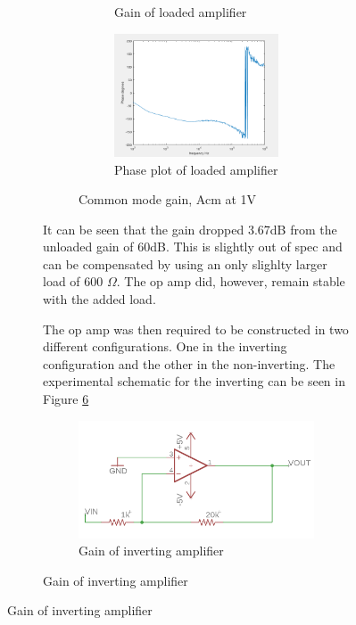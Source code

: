\begin{figure}[H]
\begin{subfigure}[b]{0.45\textwidth}
\begin{figure}[H]
\begin{subfigure}[b]{0.45\textwidth}
		\caption{Gain of loaded amplifier}
		\label{fig:tload}
		\end{subfigure}
		\hfill
		\begin{subfigure}[b]{0.45\textwidth}
			\centering
			\includegraphics[scale=.40]{ExperimentalImplementation/phasewithload.png}
		\caption{Phase plot of loaded amplifier}
		\label{fig:phasewithload}
		\end{subfigure}
		\caption{Common mode gain, Acm at 1V}
		\label{fig:gainwithload}
	\end{figure} 
	
It can be seen that the gain dropped 3.67dB from the unloaded gain of 60dB. This is slightly out of spec and can be compensated by using an only slighlty larger load of 600 $\Omega$. The op amp did, however, remain stable with the added load.
	
	
	
The op amp was then required to be constructed in two different configurations. One in the inverting configuration and the other in the non-inverting. The experimental schematic for the inverting can be seen in Figure \ref{fig:invertingschem}

		\begin{figure}[H]
	\begin{center}
		\includegraphics[scale=.40]{ExperimentalImplementation/invertingschem.png}
		\caption{Gain of inverting amplifier}
		\label{fig:invertingschem}
	\end{center}
\end{figure}


\end{subfigure}
\end{figure}
